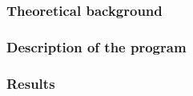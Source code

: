 \graphicspath{{./figures/}}

\part{}

\section{Theoretical background}

\section{Description of the program}

\section{Results}


